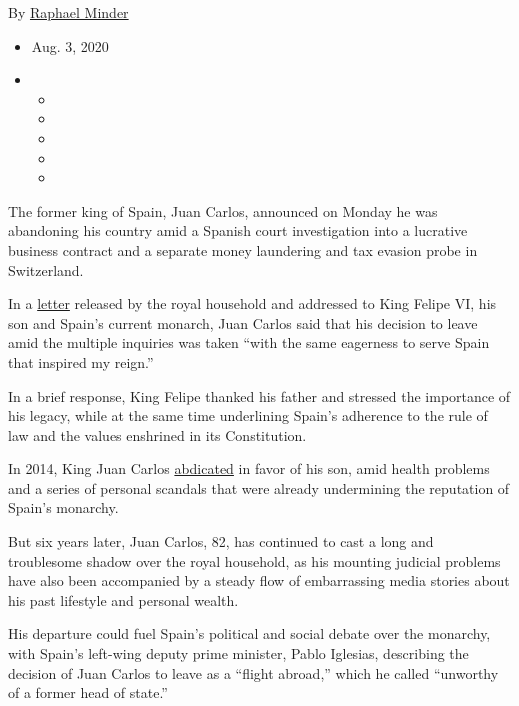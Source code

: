 By \href{https://www.nytimes.com/by/raphael-minder}{Raphael Minder}

\begin{itemize}
\item
  Aug. 3, 2020
\item
  \begin{itemize}
  \item
  \item
  \item
  \item
  \item
  \end{itemize}
\end{itemize}

The former king of Spain, Juan Carlos, announced on Monday he was
abandoning his country amid a Spanish court investigation into a
lucrative business contract and a separate money laundering and tax
evasion probe in Switzerland.

In a
\href{https://www.casareal.es/EN/AreaPrensa/Paginas/area_prensa_comunicados_interior.aspx?data=113}{letter}
released by the royal household and addressed to King Felipe VI, his son
and Spain's current monarch, Juan Carlos said that his decision to leave
amid the multiple inquiries was taken ``with the same eagerness to serve
Spain that inspired my reign.''

In a brief response, King Felipe thanked his father and stressed the
importance of his legacy, while at the same time underlining Spain's
adherence to the rule of law and the values enshrined in its
Constitution.

In 2014, King Juan Carlos
\href{https://www.nytimes.com/2014/06/12/world/europe/spanish-lawmakers-clear-way-for-kings-abdication.html}{abdicated}
in favor of his son, amid health problems and a series of personal
scandals that were already undermining the reputation of Spain's
monarchy.

But six years later, Juan Carlos, 82, has continued to cast a long and
troublesome shadow over the royal household, as his mounting judicial
problems have also been accompanied by a steady flow of embarrassing
media stories about his past lifestyle and personal wealth.

His departure could fuel Spain's political and social debate over the
monarchy, with Spain's left-wing deputy prime minister, Pablo Iglesias,
describing the decision of Juan Carlos to leave as a ``flight abroad,''
which he called ``unworthy of a former head of state.''

